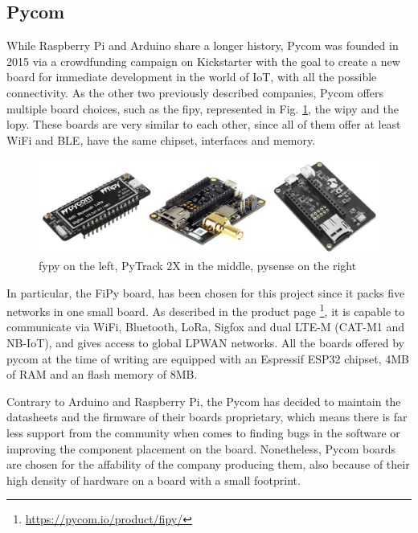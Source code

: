 	\subsection{Pycom}
		
		While Raspberry Pi and Arduino share a longer history, Pycom was founded in 2015 via a crowdfunding campaign on Kickstarter with the goal to create a new board for immediate development in the world of IoT, with all the possible connectivity.
		As the other two previously described companies, Pycom offers multiple board choices, such as the fipy, represented in Fig. \ref{img:pycom_board}, the wipy and the lopy.
		These boards are very similar to each other, since all of them offer at least WiFi and BLE, have the same chipset, interfaces and memory.
		
		\begin{figure}
			\centering
			\includegraphics[width=\textwidth]{resources/img/chap3/pycom_board}
			\caption{fypy on the left, PyTrack 2X in the middle, pysense on the right}
			\label{img:pycom_board}
		\end{figure}	
		
		In particular, the FiPy board, has been chosen for this project since it packs five networks in one small board.
		As described in the product page \footnote{\url{https://pycom.io/product/fipy/}}, it is capable to communicate via WiFi, Bluetooth, LoRa, Sigfox and dual LTE-M (CAT-M1 and NB-IoT), and gives access to global LPWAN networks.
		All the boards offered by pycom at the time of writing are equipped with an Espressif ESP32 chipset, 4MB of RAM and an flash memory of 8MB.
		
		Contrary to Arduino and Raspberry Pi, the Pycom has decided to maintain the datasheets and the firmware of their boards proprietary, which means there is far less support from the community when comes to finding bugs in the software or improving the component placement on the board.
		Nonetheless, Pycom boards are chosen for the affability of the company producing them, also because of their high density of hardware on a board with a small footprint.
		
